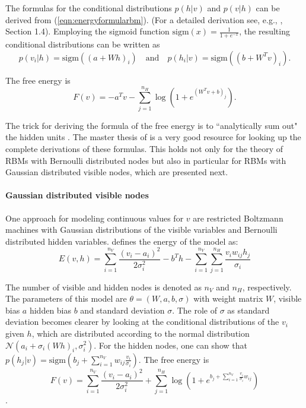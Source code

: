 \documentclass[12pt]{article}
\newcommand{\sigm}{\mathrm{sigm}}
\begin{document}
The formulas for the conditional distributions $p(h | v)$ and $p(v | h)$ can be derived from (\ref{eqn:energyformularbm}). (For a detailed derivation see, e.g., \cite{krizhevsky2009tinyimagesthesis}, Section 1.4).
Employing the sigmoid function $\sigm(x) = \frac{1}{1+ e^{-x}}$, the resulting conditional distributions can be written as
\begin{equation}
p(v_i | h) = \sigm ((a + W h)_i)
 \quad \text{and}\quad
p(h_i | v) = \sigm ((b + W^T v)_i).
\label{eqn:condprobrbm}
\end{equation}

The free energy is
\begin{equation}
F(v) = - a^T v - \sum_{j=1}^{n_H} \log \left (1 + e^{(W^T v + b)_j}\right).
\label{eqn:freenergy_rbm}
\end{equation}

The trick for deriving the formula of the free energy is to ``analytically sum out" the hidden units \citep{sala2012anefficient}.
The master thesis of \cite{krizhevsky2009tinyimagesthesis} is a very good resource for looking up the complete derivations of these formulas. This holds not only for the theory of RBMs with Bernoulli distributed nodes but also in particular for RBMs with Gaussian distributed visible nodes, which are presented next.

\paragraph{Gaussian distributed visible nodes}\label{gaussianrbm}
One approach for modeling continuous values for $v$ are restricted Boltzmann machines with Gaussian distributions of the visible variables and Bernoulli distributed hidden variables. \cite{krizhevsky2009tinyimagesthesis} defines the energy of the model  as:
\begin{equation}
   E(v,h) = \sum_{i=1}^{n_V}\frac{(v_i - a_i)^2}{2\sigma_i^2} - b^T h - \sum_{i=1}^{n_V} \sum_{j=1}^{n_H} \frac{v_i w_{ij} h_j}{\sigma_i}
   \label{eqn:energyformulagbrbm}
\end{equation}

The number of visible and hidden nodes is denoted as $n_V$ and $n_H$, respectively. The parameters of this model are $\theta = (W, a, b, \sigma)$ with weight matrix $W$, visible bias $a$ hidden bias $b$ and standard deviation $\sigma$. The role of $\sigma$ as standard deviation becomes clearer by looking at the conditional distributions of the $v_i$ given $h$, which are distributed according to the normal distribution $\mathcal{N}(a_i + \sigma_i(Wh)_i, \sigma_i^2)$. For the hidden nodes, one can show that $p(h_j | v) = \sigm \left (b_j + \sum_{i=1}^{n_V} w_{ij} \frac{v_i}{\sigma_i} \right )$.
The free energy is
\begin{equation}
   F(v) = \sum_{i=1}^{n_V}\frac{(v_i - a_i)^2}{2\sigma_i^2} + \sum_{j=1}^{n_H} \log \left (1 + e^{b_j + \sum_{i=1}^{n_V} \frac{v_i}{\sigma_i} w_{ij}} \right)
\label{eqn:freenergy_gbrbm}
\end{equation}
\citep{krizhevsky2009tinyimagesthesis}.
\end{document}
